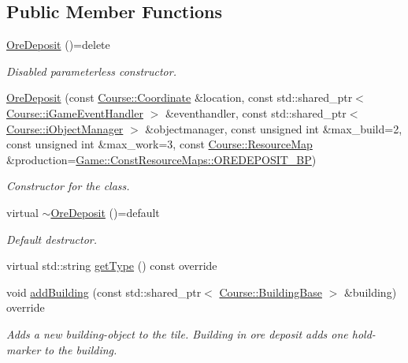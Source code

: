 \subsection*{Public Member Functions}
\begin{DoxyCompactItemize}
\item 
\hyperlink{classGame_1_1OreDeposit_a9e68e72e04c7525b24f6cf32b61f9df3}{Ore\-Deposit} ()=delete
\begin{DoxyCompactList}\small\item\em Disabled parameterless constructor. \end{DoxyCompactList}\item 
\hyperlink{classGame_1_1OreDeposit_a6377d7e3031a9011704d74324f003729}{Ore\-Deposit} (const \hyperlink{classCourse_1_1Coordinate}{Course\-::\-Coordinate} \&location, const std\-::shared\-\_\-ptr$<$ \hyperlink{classCourse_1_1iGameEventHandler}{Course\-::i\-Game\-Event\-Handler} $>$ \&eventhandler, const std\-::shared\-\_\-ptr$<$ \hyperlink{classCourse_1_1iObjectManager}{Course\-::i\-Object\-Manager} $>$ \&objectmanager, const unsigned int \&max\-\_\-build=2, const unsigned int \&max\-\_\-work=3, const \hyperlink{namespaceCourse_ab9a46ed9cd00485e318e5731ea2f78d9}{Course\-::\-Resource\-Map} \&production=\hyperlink{namespaceGame_1_1ConstResourceMaps_a7b803a949c1a3e044a6a6f985928a0cc}{Game\-::\-Const\-Resource\-Maps\-::\-O\-R\-E\-D\-E\-P\-O\-S\-I\-T\-\_\-\-B\-P})
\begin{DoxyCompactList}\small\item\em Constructor for the class. \end{DoxyCompactList}\item 
virtual \hyperlink{classGame_1_1OreDeposit_a2d397792fa3cb65c27b29061b1678bb9}{$\sim$\-Ore\-Deposit} ()=default
\begin{DoxyCompactList}\small\item\em Default destructor. \end{DoxyCompactList}\item 
virtual std\-::string \hyperlink{classGame_1_1OreDeposit_acc2ba331cb40a464821fe6ebaaf63573}{get\-Type} () const override
\item 
void \hyperlink{classGame_1_1OreDeposit_af8a88425e59e4fbb12eb90cc70b22ac7}{add\-Building} (const std\-::shared\-\_\-ptr$<$ \hyperlink{classCourse_1_1BuildingBase}{Course\-::\-Building\-Base} $>$ \&building) override
\begin{DoxyCompactList}\small\item\em Adds a new building-\/object to the tile. Building in ore deposit adds one hold-\/marker to the building. \end{DoxyCompactList}\end{DoxyCompactItemize}
